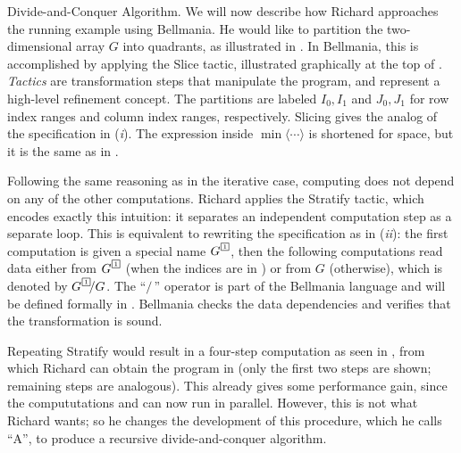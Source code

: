 \begin{paragraph}{Divide-and-Conquer Algorithm.}
We will now describe how Richard approaches the running example using Bellmania.
He would like to partition the two-di\-men\-sio\-nal array $G$ into
quadrants, as illustrated in .
In Bellmania, this is accomplished by applying the {\sf Slice} tactic,
illustrated graphically at the top of .
{\em Tactics} are transformation steps that manipulate the program,
and represent a high-level refinement concept.
The partitions are labeled $I_0,I_1$ and $J_0,J_1$ for row index ranges and column index ranges,
respectively.
Slicing gives the analog of the specification in ({\it i}).
The expression inside $\min\langle\cdots\rangle$ is shortened for space,
but it is the same as in .

Following the same reasoning as in the iterative case, computing 
does not depend on any of the other computations. Richard applies the
{\sf Stratify} tactic, which encodes exactly this intuition: it separates
an independent computation step as a separate loop.
This is equivalent to rewriting the specification as in ({\it ii}):
the first computation is given a special name $G^{\tinyqbox1}$, then the following
computations read data either from $G^{\tinyqbox1}$ (when the indices are in )
or from $G$ (otherwise), which is denoted by $G^{\tinyqbox1}\!/G$. The ``$/\,$'' operator
is part of the Bellmania language and will be defined formally in .
Bellmania checks the data dependencies and verifies that the transformation
is sound.

Repeating {\sf Stratify} would result in a four-step computation
as seen in , from which Richard can obtain the program in 
(only the first two steps are shown; remaining steps are analogous).
This already gives some performance gain, since the compututations  and 
can now run in parallel. However, this is not what Richard wants; so he
changes the development of this procedure, which he calls ``A'', to produce
a recursive divide-and-conquer algorithm.
\end{paragraph}


